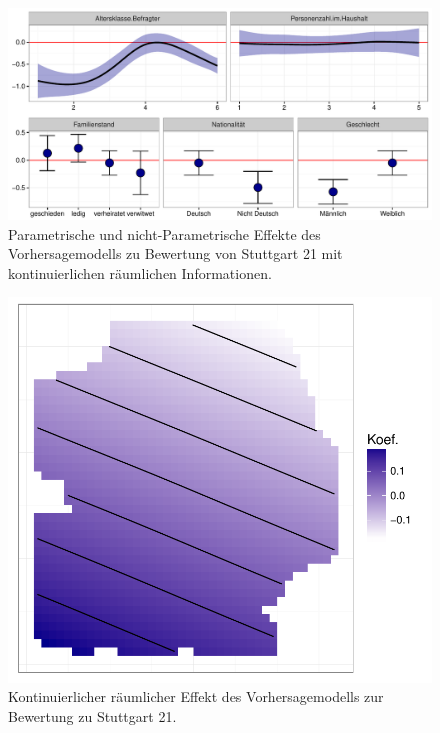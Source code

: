 \documentclass{Vorlage}
\begin{document}
\begin{figure}[h]
 \begin{center}
 \includegraphics[scale=0.8]{Pictures/S21ModelEffects}
 \caption{Parametrische und nicht-Parametrische Effekte des Vorhersagemodells zu Bewertung von Stuttgart 21 mit kontinuierlichen räumlichen Informationen.}
 \label{GKParam}
 \end{center}
\end{figure}

\begin{figure}[h]
 \begin{center}
 \includegraphics[scale=0.6]{Pictures/S21_3_Kont_SpatEff}
 \caption{Kontinuierlicher räumlicher Effekt des Vorhersagemodells zur Bewertung zu Stuttgart 21.}
 \label{S21_3_Kont_SpatEff}
 \end{center}
\end{figure}
\end{document}
